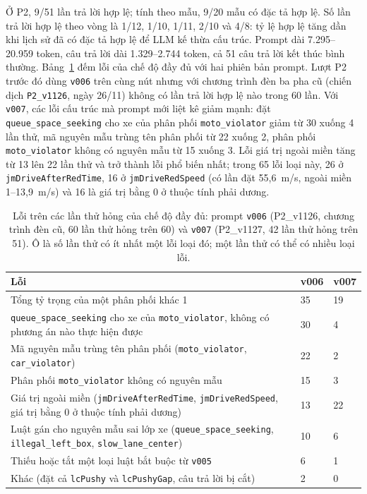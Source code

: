 \documentclass[../main.tex]{subfiles}
\begin{document}
Ở P2, 9/51 lần trả lời hợp lệ; tính theo mẫu, 9/20 mẫu có đặc tả hợp lệ. Số lần trả lời hợp lệ theo vòng là 1/12, 1/10, 1/11, 2/10 và 4/8: tỷ lệ hợp lệ tăng dần khi lịch sử đã có đặc tả hợp lệ để LLM kế thừa cấu trúc. Prompt dài 7.295--20.959 token, câu trả lời dài 1.329--2.744 token, cả 51 câu trả lời kết thúc bình thường. Bảng~\ref{table:4.qwen_errors} đếm lỗi của chế độ đầy đủ với hai phiên bản prompt. Lượt P2 trước đó dùng \texttt{v006} trên cùng nút nhưng với chương trình đèn ba pha cũ (chiến dịch \texttt{P2\_v1126}, ngày 26/11) không có lần trả lời hợp lệ nào trong 60 lần. Với \texttt{v007}, các lỗi cấu trúc mà prompt mới liệt kê giảm mạnh: đặt \texttt{queue\_space\_seeking} cho xe của phân phối \texttt{moto\_violator} giảm từ 30 xuống 4 lần thử, mã nguyên mẫu trùng tên phân phối từ 22 xuống 2, phân phối \texttt{moto\_violator} không có nguyên mẫu từ 15 xuống 3. Lỗi giá trị ngoài miền tăng từ 13 lên 22 lần thử và trở thành lỗi phổ biến nhất; trong 65 lỗi loại này, 26 ở \texttt{jmDriveAfterRedTime}, 16 ở \texttt{jmDriveRedSpeed} (có lần đặt 55,6~m/s, ngoài miền 1--13,9~m/s) và 16 là giá trị bằng 0 ở thuộc tính phải dương.

\begin{table}[!htbp]
\centering
\small
\caption{Lỗi trên các lần thử hỏng của chế độ đầy đủ: prompt \texttt{v006} (P2\_v1126, chương trình đèn cũ, 60 lần thử hỏng trên 60) và \texttt{v007} (P2\_v1127, 42 lần thử hỏng trên 51). Ô là số lần thử có ít nhất một lỗi loại đó; một lần thử có thể có nhiều loại lỗi.} \label{table:4.qwen_errors}
\begin{tabular}{|>{\raggedright\arraybackslash}p{10.0cm}|p{1.8cm}|p{1.8cm}|}
\hline
\textbf{Lỗi} & \textbf{v006} & \textbf{v007} \\ \hline
Tổng tỷ trọng của một phân phối khác 1 & 35 & 19 \\ \hline
\texttt{queue\_space\_seeking} cho xe của \texttt{moto\_violator}, không có phương án nào thực hiện được & 30 & 4 \\ \hline
Mã nguyên mẫu trùng tên phân phối (\texttt{moto\_violator}, \texttt{car\_violator}) & 22 & 2 \\ \hline
Phân phối \texttt{moto\_violator} không có nguyên mẫu & 15 & 3 \\ \hline
Giá trị ngoài miền (\texttt{jmDriveAfterRedTime}, \texttt{jmDriveRedSpeed}, giá trị bằng 0 ở thuộc tính phải dương) & 13 & 22 \\ \hline
Luật gán cho nguyên mẫu sai lớp xe (\texttt{queue\_space\_seeking}, \texttt{illegal\_left\_box}, \texttt{slow\_lane\_center}) & 10 & 6 \\ \hline
Thiếu hoặc tắt một loại luật bắt buộc từ \texttt{v005} & 6 & 1 \\ \hline
Khác (đặt cả \texttt{lcPushy} và \texttt{lcPushyGap}, câu trả lời bị cắt) & 2 & 0 \\ \hline
\end{tabular}
\end{table}
\end{document}

